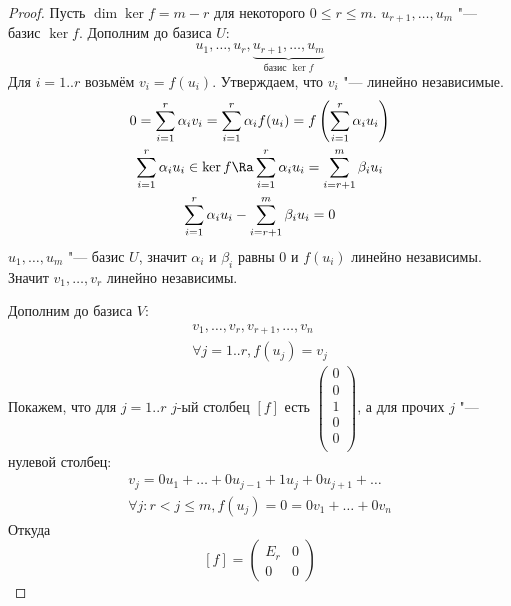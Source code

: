 \begin{proof}
	Пусть $\dim \ker f = m - r$ для некоторого $0 \le r \le m$.
	$u_{r+1}, \dots, u_m$ "--- базис $\ker f$.
	Дополним до базиса $U$:
	\[ u_1, \dots, u_r, \underbrace{u_{r+1}, \dots, u_m}_{\text{базис $\ker f$}} \]
	Для $i = 1..r$ возьмём $v_i = f(u_i)$.
	Утверждаем, что $v_i$ "--- линейно независимые.
	\begin{gather*}
		0 = \sum_{i=1}^r \alpha_iv_i = \sum_{i=1}^r \alpha_if(u_i)= f\left(\sum_{i=1}^r \alpha_iu_i\right) \\
		\sum_{i=1}^r \alpha_iu_i \in \ker f \Ra \sum_{i=1}^r \alpha_iu_i = \sum_{i=r+1}^m \beta_i u_i \\
		\sum_{i=1}^r \alpha_iu_i - \sum_{i=r+1}^m \beta_iu_i = 0
	\end{gather*}
	$u_1, \dots, u_m$ "--- базис $U$, значит $\alpha_i$ и $\beta_i$ равны $0$ и $f(u_i)$ линейно независимы.
	Значит $v_1, \dots, v_r$ линейно независимы.

	Дополним до базиса $V$:
	\begin{gather*}
		v_1, \dots, v_r, v_{r+1}, \dots, v_n \\
		\forall j=1..r, f(u_j) = v_j
	\end{gather*}
	Покажем, что для $j=1..r$ $j$-ый столбец $[f]$ есть $\begin{pmatrix} 0 \\0 \\1 \\0 \\0 \\ \end{pmatrix}$,
	а для прочих $j$ "--- нулевой столбец:
	\begin{gather*}
		v_j = 0u_1 + \dots + 0u_{j-1} + 1u_j + 0u_{j+1} + \dots \\
		\forall j\colon r < j \le m, f(u_j) = 0 = 0 v_1 + \dots + 0v_n
	\end{gather*}
	Откуда
	\[
		[f] = \begin{pmatrix}
			E_r & 0 \\
			0   & 0
		\end{pmatrix}
	\]
\end{proof}

